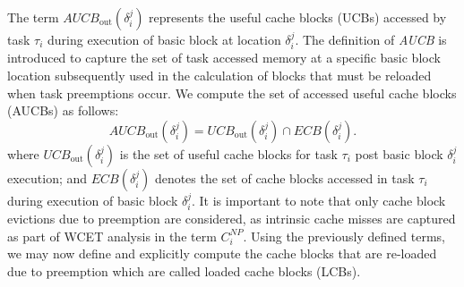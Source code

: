 \noindent The term \begin{math}\textit{AUCB}_{\textrm{out}}(\delta_{i}^{j})\end{math} represents the useful cache blocks (UCBs) accessed by task \begin{math}\tau_{i}\end{math} during execution of basic block at location \begin{math}\delta_{i}^{j}\end{math}. The definition of \textit{AUCB} is introduced to capture the set of task accessed memory at a specific basic block location subsequently used in the calculation of blocks that must be reloaded when task preemptions occur.  We compute the set of accessed useful cache blocks (AUCBs) as follows:
\begin{equation}\label{eqn:aucb-formula}
    \textit{AUCB}_{\textrm{out}}(\delta_{i}^{j}) = \textit{UCB}_{\textrm{out}}(\delta_{i}^{j}) \cap \textit{ECB}(\delta_{i}^{j}).
\end{equation}
\noindent where \begin{math}\textit{UCB}_{\textrm{out}}(\delta_{i}^{j})\end{math} is the set of useful cache blocks for task \begin{math}\tau_{i}\end{math} post basic block \begin{math}\delta_{i}^{j}\end{math} execution; and \begin{math}\textit{ECB}(\delta_{i}^{j})\end{math} denotes the set of cache blocks accessed in task \begin{math}\tau_{i}\end{math} during execution of basic block \begin{math}\delta_{i}^{j}\end{math}. It is important to note that only cache block evictions due to preemption are considered, as intrinsic cache misses are captured as part of WCET analysis in the term \begin{math}C_{i}^{NP}\end{math}.  Using the previously defined terms, we may now define and explicitly compute the cache blocks that are re-loaded due to preemption which are called loaded cache blocks (LCBs).

